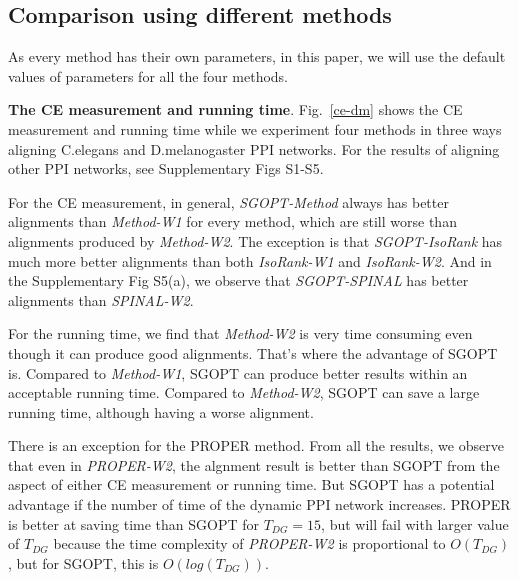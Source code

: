 \documentclass{bioinfo}
\theoremstyle{definition}
\begin{document}
\subsection{Comparison using different methods}
As every method has their own parameters, in this paper, we will use the default values of parameters for all the four methods.

\textbf{The CE measurement and running time}. Fig.~\ref{ce-dm} shows the CE measurement and running time while we experiment four methods in three ways aligning C.elegans and D.melanogaster PPI networks. For the results of aligning other PPI networks, see Supplementary Figs S1-S5. 

For the CE measurement, in general, \textit{SGOPT-Method} always has better alignments than \textit{Method-W1} for every method, which are still worse than alignments produced by \textit{Method-W2}. The exception is that \textit{SGOPT-IsoRank} has much more better alignments than both \textit{IsoRank-W1} and \textit{IsoRank-W2}. And in the Supplementary Fig S5(a), we observe that \textit{SGOPT-SPINAL} has better alignments than \textit{SPINAL-W2}.

For the running time, we find that \textit{Method-W2} is very time consuming even though it can produce good alignments. That's where the advantage of SGOPT is. Compared to \textit{Method-W1}, SGOPT can produce better results within an acceptable running time. Compared to \textit{Method-W2}, SGOPT can save a large running time, although having a worse alignment.  

There is an exception for the PROPER method. From all the results, we observe that even in \textit{PROPER-W2}, the algnment result is better than SGOPT from the aspect of either CE measurement or running time. But SGOPT has a potential advantage if the number of time of the dynamic PPI network increases. PROPER is better at saving time than SGOPT for $T_{DG}=15$, but will fail with larger value of $T_{DG}$ because the time complexity of \textit{PROPER-W2} is proportional to $O(T_{DG})$, but for SGOPT, this is $O(log(T_{DG}))$.
\end{document}
